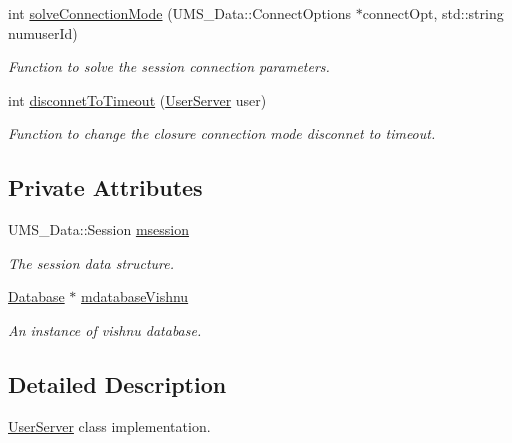 \begin{DoxyCompactItemize}
int \hyperlink{classSessionServer_af64544a743117d025df4248e82de2321}{solveConnectionMode} (UMS\_\-Data::ConnectOptions $\ast$connectOpt, std::string numuserId)
\begin{DoxyCompactList}\small\item\em Function to solve the session connection parameters. \item\end{DoxyCompactList}\item 
int \hyperlink{classSessionServer_a6dd2ad0cba4c14cb23beb28b19dde390}{disconnetToTimeout} (\hyperlink{classUserServer}{UserServer} user)
\begin{DoxyCompactList}\small\item\em Function to change the closure connection mode disconnet to timeout. \item\end{DoxyCompactList}\end{DoxyCompactItemize}
\subsection*{Private Attributes}
\begin{DoxyCompactItemize}
\item 
\hypertarget{classSessionServer_acad3f309e8c4ac30ecb2458c1bc830bb}{
UMS\_\-Data::Session \hyperlink{classSessionServer_acad3f309e8c4ac30ecb2458c1bc830bb}{msession}}
\label{classSessionServer_acad3f309e8c4ac30ecb2458c1bc830bb}

\begin{DoxyCompactList}\small\item\em The session data structure. \item\end{DoxyCompactList}\item 
\hypertarget{classSessionServer_a050132782999456a25c7bd0651b30558}{
\hyperlink{classDatabase}{Database} $\ast$ \hyperlink{classSessionServer_a050132782999456a25c7bd0651b30558}{mdatabaseVishnu}}
\label{classSessionServer_a050132782999456a25c7bd0651b30558}

\begin{DoxyCompactList}\small\item\em An instance of vishnu database. \item\end{DoxyCompactList}\end{DoxyCompactItemize}


\subsection{Detailed Description}
\hyperlink{classUserServer}{UserServer} class implementation. 

